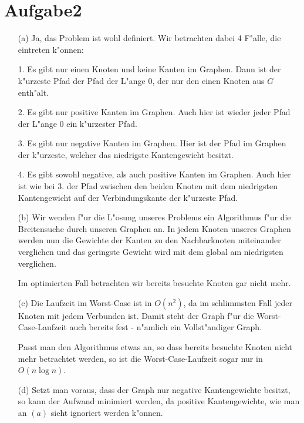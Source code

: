 \documentclass{article}
\begin{document}
\section*{Aufgabe2}
\begin{enumerate}
\item[(a)] Ja, das Problem ist wohl definiert. Wir betrachten dabei 4 F"alle,
die eintreten k"onnen:

1. Es gibt nur einen Knoten und keine Kanten im Graphen. Dann ist der k"urzeste
Pfad der Pfad der L"ange \(0\), der nur den einen Knoten aus \(G\) enth"alt.

2. Es gibt nur positive Kanten im Graphen. Auch hier ist wieder jeder Pfad der
L"ange \(0\) ein k"urzester Pfad.

3. Es gibt nur negative Kanten im Graphen. Hier ist der Pfad im Graphen der
k"urzeste, welcher das niedrigste Kantengewicht besitzt.

4. Es gibt sowohl negative, als auch positive Kanten im Graphen. Auch hier ist
wie bei 3. der Pfad zwischen den beiden Knoten mit dem niedrigsten Kantengewicht
auf der Verbindungskante der k"urzeste Pfad.

\item[(b)] Wir wenden f"ur die L"osung unseres Problems ein Algorithmus f"ur
die Breitensuche durch unseren Graphen an. In jedem Knoten unseres Graphen
werden nun die Gewichte der Kanten zu den Nachbarknoten miteinander
verglichen und das geringste Gewicht wird mit dem global am niedrigsten
verglichen.

Im optimierten Fall betrachten wir bereits besuchte Knoten gar nicht mehr.

\item[(c)] Die Laufzeit im Worst-Case ist in \(O(n^2)\), da im schlimmsten Fall
jeder Knoten mit jedem Verbunden ist. Damit steht der Graph f"ur die
Worst-Case-Laufzeit auch bereits fest - n"amlich ein Vollst"andiger Graph.

Passt man den Algorithmus etwas an, so dass bereits besuchte Knoten nicht mehr
betrachtet werden, so ist die Worst-Case-Laufzeit sogar nur in \(O(n \log n)\).

\item[(d)] Setzt man voraus, dass der Graph nur negative Kantengewichte besitzt,
so kann der Aufwand minimiert werden, da positive Kantengewichte, wie man an
\((a)\) sieht ignoriert werden k"onnen.
\end{enumerate}
\end{document}

